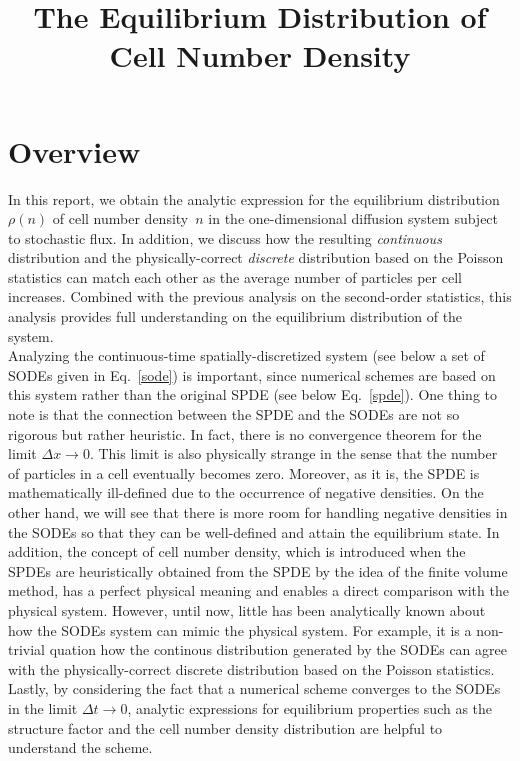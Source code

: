 \documentclass{article}
\newcommand{\dx}{{\Delta x}}
\newcommand{\dt}{{\Delta t}}
\begin{document}
\title{The Equilibrium Distribution of Cell Number Density}
\author{}
\date{}
\maketitle

\section{\label{sec_overview}Overview}

In this report, we obtain the analytic expression for the equilibrium distribution~$\rho(n)$ of cell number density~$n$ in the one-dimensional diffusion system subject to stochastic flux.
In addition, we discuss how the resulting \textit{continuous} distribution and the physically-correct \textit{discrete} distribution based on the Poisson statistics can match each other as the average number of particles per cell increases. 
Combined with the previous analysis on the second-order statistics, this analysis provides full understanding on the equilibrium distribution of the system.
\\

\noindent Analyzing the continuous-time spatially-discretized system (see below a set of SODEs given in Eq.~\eqref{sode}) is important, since numerical schemes are based on this system rather than the original SPDE (see below Eq.~\eqref{spde}).
One thing to note is that the connection between the SPDE and the SODEs are not so rigorous but rather heuristic.
In fact, there is no convergence theorem for the limit $\dx\rightarrow0$.
This limit is also physically strange in the sense that the number of particles in a cell eventually becomes zero.
Moreover, as it is, the SPDE is mathematically ill-defined due to the occurrence of negative densities.
On the other hand, we will see that there is more room for handling negative densities in the SODEs so that they can be well-defined and attain the equilibrium state.
In addition, the concept of cell number density, which is introduced when the SPDEs are heuristically obtained from the SPDE by the idea of the finite volume method, has a perfect physical meaning and enables a direct comparison with the physical system.
However, until now, little has been analytically known about how the SODEs system can mimic the physical system.
For example, it is a non-trivial quation how the continous distribution generated by the SODEs can agree with the physically-correct discrete distribution based on the Poisson statistics.
Lastly, by considering the fact that a numerical scheme converges to the SODEs in the limit $\dt\rightarrow0$, analytic expressions for equilibrium properties such as the structure factor and the cell number density distribution are helpful to understand the scheme. 
\\
\end{document}

